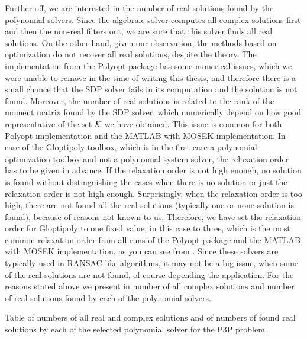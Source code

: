 Further off, we are interested in the number of real solutions found by the polynomial solvers.
Since the algebraic solver computes all complex solutions first and then the non-real filters out, we are sure that this solver finds all real solutions.
On the other hand, given our observation, the methods based on optimization do not recover all real solutions, despite the theory.
The implementation from the Polyopt package has some numerical issues, which we were unable to remove in the time of writing this thesis, and therefore there is a small chance that the SDP solver fails in its computation and the solution is not found.
Moreover, the number of real solutions is related to the rank of the moment matrix found by the SDP solver, which  numerically depend on how good representative of the set $\mathcal{K}$ we have obtained.
This issue is common for both Polyopt implementation and the MATLAB with MOSEK implementation.
In case of the Gloptipoly toolbox, which is in the first case a polynomial optimization toolbox and not a polynomial system solver, the relaxation order has to be given in advance.
If the relaxation order is not high enough, no solution is found without distinguishing the cases when there is no solution or just the relaxation order is not high enough.
Surprisingly, when the relaxation order is too high, there are not found all the real solutions (typically one or none solution is found), because of reasons not known to us.
Therefore, we have set the relaxation order for Gloptipoly to one fixed value, in this case to three, which is the most common relaxation order from all runs of the Polyopt package and the MATLAB with MOSEK implementation, as you can see from .
Since these solvers are typically used in RANSAC-like \cite{ransac} algorithms, it may not be a big issue, when some of the real solutions are not found, of course depending the application.
For the reasons stated above we present in  number of all complex solutions and number of real solutions found by each of the polynomial solvers.

\begin{table}[ht]
  \centering
  
  \caption{Table of numbers of all real and complex solutions and of numbers of found real solutions by each of the selected polynomial solver for the P3P problem.}
\end{table}

